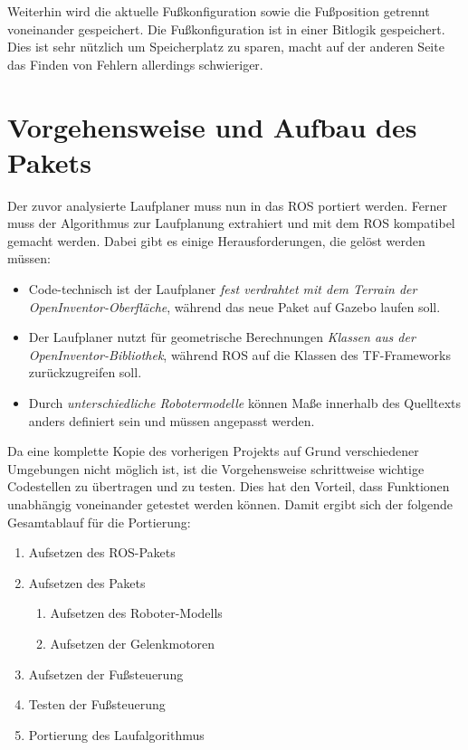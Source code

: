 \begin{itemize}
Weiterhin wird die aktuelle Fußkonfiguration sowie die Fußposition getrennt voneinander gespeichert. Die Fußkonfiguration ist in einer Bitlogik gespeichert. Dies ist sehr nützlich um Speicherplatz zu sparen, macht auf der anderen Seite das Finden von Fehlern allerdings schwieriger.

\section{Vorgehensweise und Aufbau des Pakets}

Der zuvor analysierte Laufplaner muss nun in das \ac{ROS} portiert werden. Ferner muss der Algorithmus zur Laufplanung extrahiert und mit dem \ac{ROS} kompatibel gemacht werden. Dabei gibt es einige Herausforderungen, die gelöst werden müssen:
\begin{itemize}
  \item Code-technisch ist der Laufplaner \emph{fest verdrahtet mit dem Terrain der OpenInventor-Oberfläche}, während das neue Paket auf Gazebo laufen soll.
  \item Der Laufplaner nutzt für geometrische Berechnungen \emph{Klassen aus der OpenInventor-Bibliothek}, während \ac{ROS} auf die Klassen des TF-Frameworks zurückzugreifen soll.
  \item Durch \emph{unterschiedliche Robotermodelle} können Maße innerhalb des Quelltexts anders definiert sein und müssen angepasst werden.
\end{itemize}

Da eine komplette Kopie des vorherigen Projekts auf Grund verschiedener Umgebungen nicht möglich ist, ist die Vorgehensweise schrittweise wichtige Codestellen zu übertragen und zu testen. Dies hat den Vorteil, dass Funktionen unabhängig voneinander getestet werden können. Damit ergibt sich der folgende Gesamtablauf für die Portierung:
\begin{enumerate}
  \item Aufsetzen des \ac{ROS}-Pakets
  \item Aufsetzen des Pakets
  \begin{enumerate}
    \item Aufsetzen des Roboter-Modells
    \item Aufsetzen der Gelenkmotoren
  \end{enumerate}
  \item Aufsetzen der Fußsteuerung
  \item Testen der Fußsteuerung
  \item Portierung des Laufalgorithmus
\end{enumerate}


\end{itemize}
